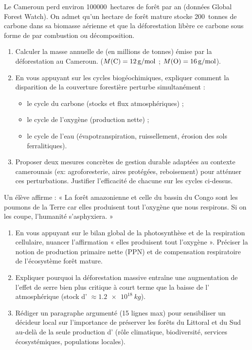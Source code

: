 \documentclass[11pt]{article}
\begin{document}
\begin{exercice}
Le Cameroun perd environ \SI{100 000}{hectares} de forêt par an (données Global Forest Watch). On admet qu'un hectare de forêt mature stocke \SI{200}{tonnes} de carbone dans sa biomasse aérienne et que la déforestation libère ce carbone sous forme de  par combustion ou décomposition.

\begin{enumerate}
    \item Calculer la masse annuelle de  (en millions de tonnes) émise par la déforestation au Cameroun. ($M(\ce{C}) = \SI{12}{g/mol}$ ; $M(\ce{O}) = \SI{16}{g/mol}$).
    \item En vous appuyant sur les cycles biogéochimiques, expliquer comment la disparition de la couverture forestière perturbe simultanément :
    \begin{itemize}
        \item le cycle du carbone (stocks et flux atmosphériques) ;
        \item le cycle de l'oxygène (production nette) ;
        \item le cycle de l'eau (évapotranspiration, ruissellement, érosion des sols ferralitiques).
    \end{itemize}
    \item Proposer deux mesures concrètes de gestion durable adaptées au contexte camerounais (ex: agroforesterie, aires protégées, reboisement) pour atténuer ces perturbations. Justifier l'efficacité de chacune sur les cycles ci-dessus.
\end{enumerate}
\end{exercice}

\begin{exercice}
Un élève affirme : « La forêt amazonienne et celle du bassin du Congo sont les poumons de la Terre car elles produisent tout l'oxygène que nous respirons. Si on les coupe, l'humanité s'asphyxiera. »

\begin{enumerate}
    \item En vous appuyant sur le bilan global de la photosynthèse et de la respiration cellulaire, nuancer l'affirmation « elles produisent tout l'oxygène ». Préciser la notion de production primaire nette (PPN) et de compensation respiratoire de l'écosystème forêt mature.
    \item Expliquer pourquoi la déforestation massive entraîne une augmentation de l'effet de serre bien plus critique à court terme que la baisse de l' atmosphérique (stock d' $\approx \SI{1,2e18}{kg}$).
    \item Rédiger un paragraphe argumenté (15 lignes max) pour sensibiliser un décideur local sur l'importance de préserver les forêts du Littoral et du Sud au-delà de la seule production d' (rôle climatique, biodiversité, services écosystémiques, populations locales).
\end{enumerate}
\end{exercice}
\end{document}
